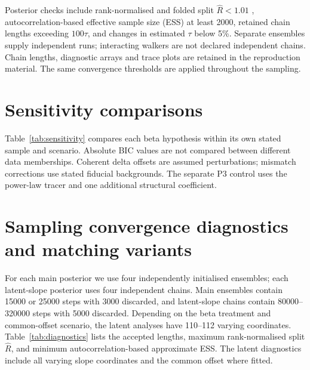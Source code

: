 \documentclass{aa}
\begin{document}
Posterior checks include rank-normalised and folded split $\widehat R<1.01$ \citep{Vehtari2021}, autocorrelation-based effective sample size (ESS) at least 2000, retained chain lengths exceeding $100\tau$, and changes in estimated $\tau$ below 5\%. Separate ensembles supply independent runs; interacting walkers are not declared independent chains. Chain lengths, diagnostic arrays and trace plots are retained in the reproduction material. The same convergence thresholds are applied throughout the sampling.


\section{Sensitivity comparisons}\label{sec:sensitivity}
Table~\ref{tab:sensitivity} compares each beta hypothesis within its own stated sample and scenario. Absolute BIC values are not compared between different data memberships. Coherent delta offsets are assumed perturbations; mismatch corrections use stated fiducial backgrounds. The separate P3 control uses the power-law tracer and one additional structural coefficient.
\begin{table}[t]\centering\small
\caption{Sensitivity comparisons. Positive fixed-minus-free differences favour the free model within the given row. Subset differences conflate information loss, selection and changed design; they are not estimates of a causal survey effect.}
\label{tab:sensitivity}\end{table}

\section{Sampling convergence diagnostics and matching variants}\label{sec:repro}
For each main posterior we use four independently initialised ensembles; each latent-slope posterior uses four independent chains. Main ensembles contain 15000 or 25000 steps with 3000 discarded, and latent-slope chains contain 80000--320000 steps with 5000 discarded. Depending on the beta treatment and common-offset scenario, the latent analyses have 110--112 varying coordinates. Table~\ref{tab:diagnostics} lists the accepted lengths, maximum rank-normalised split $\widehat R$, and minimum autocorrelation-based approximate ESS. The latent diagnostics include all varying slope coordinates and the common offset where fitted.
\end{document}
